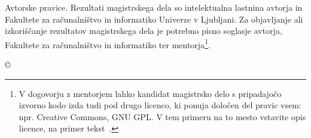 \thispagestyle{empty}
\vspace*{\fill}
{\noindent\footnotesize
{\sc Avtorske pravice}. Rezultati magistrskega dela so intelektualna lastnina avtorja in Fakultete za ra\-ču\-nal\-niš\-tvo in informatiko Univerze v Ljubljani. Za objavljanje ali izkoriščanje rezultatov ma\-gi\-str\-ske\-ga dela je potrebno pisno soglasje avtorja, Fakultete za ra\-ču\-nal\-niš\-tvo in informatiko ter mentorja\footnote{V dogovorju z mentorjem lahko kandidat magistrsko delo s pripadajočo izvorno kodo izda tudi pod drugo licenco, ki ponuja določen del pravic vsem: npr. Creative Commons, GNU GPL. V tem primeru na to mesto vstavite opis licence, na primer tekst~\cite{licence}.}.}
\begin{center}
{\footnotesize{\sc \copyright \myyear\ \tauthor}}
\end{center}